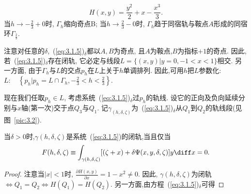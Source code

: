 \begin{equation}
  \label{eq:3.1.7}
  H(x, y)=\frac{y^{2}}{2}+x-\frac{x^{3}}{3}.
\end{equation}
当$h \rightarrow-\frac{2}{3}+0$时,
$\Gamma_h$缩向奇点B;
当$h \rightarrow \frac{2}{3}-0$时,
$\Gamma_h$趋于同宿轨与鞍点$A$形成的同宿环$\Gamma_{\frac{2}{3}}$.
\par
注意对任意的$\delta$,~(\ref{eq:3.1.5})$_{\delta}$都以$A,B$为奇点,
且$A$为鞍点,$B$为指标$+1$的奇点.
因此,若~(\ref{eq:3.1.5})$_{\delta}$存在闭轨,
它必定与线段$L=\{(x, y) | y=0,-1<x<1\}$相交.
另一方面,
由于$\Gamma_h$与$L$的交点$p_h$在$L$上关于$h$单调排列.
因此,可用$h$把$L$参数化:
$L: \quad\left\{p_{h} | p_{h}=L \cap \Gamma_{h},-\frac{2}{3}<h<\frac{2}{3}\right\}$.
\par
现在我们任取$p_h\in L$,
考虑系统~(\ref{eq:3.1.5})$_{\delta}$过$p_{h}$的轨线.
设它的正向及负向延续分别与$x$轴(第一次)交于点$Q_3$与$Q_1$.
记$\gamma_{(h, \delta, \zeta)}$为~(\ref{eq:3.1.5})$_{\delta}$从$Q_1$到$Q_2$的轨线段(见图~\ref{pic:3.2}).
\begin{collory}
  \label{col:3.1.2}
  当$\delta>0$时,$\gamma(h, \delta, \zeta)$是系统~(\ref{eq:3.1.5})的闭轨,当且仅当
  \begin{equation}
    \label{eq:3.1.8}
    F(h, \delta, \zeta) \equiv \int_{\gamma(h, \delta, \zeta)}[(\zeta+x)+\delta \Psi(x, y, \delta, \zeta)] y \diff x=0.
  \end{equation}
\end{collory}
\begin{proof}
  注意当$|x|<1$时,
  $\frac{\partial H(x,y)}{\partial x}=1-x^{2} \neq 0$.
  因此,
  $\gamma(h,\delta,\zeta)$为闭轨$\Leftrightarrow Q_{1}=Q_{2} \Leftrightarrow H\left(Q_{1}\right)=H\left(Q_{2}\right)$.
  另一方面,由方程~(\ref{eq:3.1.5})$_{\delta}$可得
\end{proof}